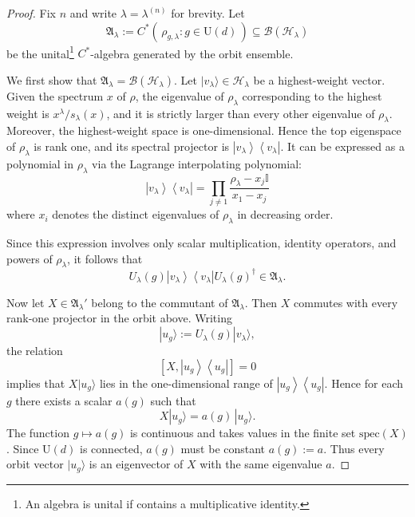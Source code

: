 \documentclass[a4paper,onecolumn,11pt]{quantumarticle}
\newcommand{\ketbra}[2]{\left|#1\right\rangle\!\!\left\langle #2\right|}
\def\h{\mathcal{H}}
\def\id{\mathbb{I}}
\begin{document}
\begin{proof}
Fix $n$ and write $\lambda=\lambda^{(n)}$ for brevity.
Let
\begin{equation}
    \mathfrak A_\lambda
    := 
    C^*\!\left(\,\rho_{g,\lambda}:g\in \mathrm U(d)\,\right)
    \subseteq \mathcal B(\h_\lambda)
\end{equation}
be the unital\footnote{An algebra is unital if contains a multiplicative identity.} $C^*$-algebra generated by the orbit ensemble.

We first show that $\mathfrak A_\lambda = \mathcal B(\h_\lambda)$.
Let $|v_\lambda\rangle\in \h_\lambda$ be a highest-weight vector.
Given the spectrum $x$ of $\rho$, the eigenvalue of $\rho_\lambda$ corresponding to the highest weight is $x^\lambda/s_\lambda(x)$,
and it is strictly larger than every other eigenvalue of $\rho_\lambda$.
Moreover, the highest-weight space is one-dimensional.
Hence the top eigenspace of $\rho_\lambda$ is rank one, and its spectral projector is $\ketbra{v_\lambda}{v_\lambda}$. It can be expressed as a polynomial in $\rho_\lambda$ via the Lagrange interpolating polynomial:
\begin{equation}
\ketbra{v_\lambda}{v_\lambda} = \prod_{j \neq 1} \frac{\rho_\lambda - x_j \id}{x_1 - x_j}
\end{equation}
where $x_i$ denotes the distinct eigenvalues of $\rho_\lambda$ in decreasing order.

Since this expression involves only scalar multiplication, identity operators, and powers of $\rho_\lambda$, it follows that 
\begin{equation}
U_\lambda(g) \ketbra{v_\lambda}{v_\lambda} U_\lambda(g)^\dagger \in \mathfrak{A}_\lambda.
\end{equation}

Now let $X\in \mathfrak A_\lambda'$ belong to the commutant of $\mathfrak A_\lambda$.
Then $X$ commutes with every rank-one projector in the orbit above.
Writing
\begin{equation}
|u_g\rangle:= U_\lambda(g)|v_\lambda\rangle,
\end{equation}
the relation
\begin{equation}
\left[X,\ketbra{u_g}{u_g}\right]=0
\end{equation}
implies that $X|u_g\rangle$ lies in the one-dimensional range of $\ketbra{u_g}{u_g}$.
Hence for each $g$ there exists a scalar $a(g)$ such that
\begin{equation}
    X|u_g\rangle = a(g)\,|u_g\rangle .
\end{equation}
The function $g\mapsto a(g)$ is continuous and takes values in the finite set $\mathrm{spec}(X)$.
Since $\mathrm U(d)$ is connected, $a(g)$ must be constant $a(g):= a$. 
Thus every orbit vector $|u_g\rangle$ is an eigenvector of $X$ with the same eigenvalue $a$.


\end{proof}
\end{document}
